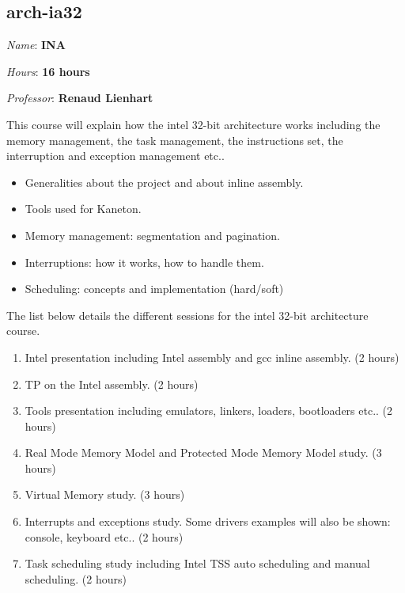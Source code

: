\begin{multicols}{2}
%
%

\section{arch-ia32}

\textit{Name}: \textbf{INA}

\textit{Hours}: \textbf{16 hours}

\textit{Professor}: \textbf{Renaud Lienhart}

This course will explain how the intel 32-bit architecture works including
the memory management, the task management, the instructions set, the
interruption and exception management etc..

\begin{itemize}
  \item
    Generalities about the project and about inline assembly.
  \item
    Tools used for Kaneton.
  \item
    Memory management: segmentation and pagination.
  \item
    Interruptions: how it works, how to handle them.
  \item
    Scheduling: concepts and implementation (hard/soft)
\end{itemize}

The list below details the different sessions for the intel 32-bit
architecture course.

\begin{enumerate}
  \item
    Intel presentation including Intel assembly and gcc inline assembly.
    (2 hours)
  \item
    TP on the Intel assembly. (2 hours)
  \item
    Tools presentation including emulators, linkers, loaders, bootloaders
    etc.. (2 hours)
  \item
    Real Mode Memory Model and Protected Mode Memory Model study.
    (3 hours)
  \item
    Virtual Memory study. (3 hours)
  \item
    Interrupts and exceptions study. Some drivers examples will also
    be shown: console, keyboard etc.. (2 hours)
  \item
    Task scheduling study including Intel TSS auto scheduling and
    manual scheduling. (2 hours)
\end{enumerate}



%
%


\end{multicols}
